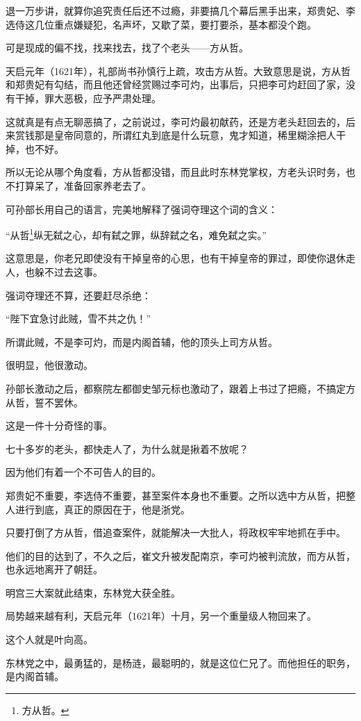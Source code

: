 \begin{multicols}{\theparacolNo}
		退一万步讲，就算你追究责任后还不过瘾，非要搞几个幕后黑手出来，郑贵妃、李选侍这几位重点嫌疑犯，名声坏，又歇了菜，要打要杀，基本都没个跑。

		可是现成的偏不找，找来找去，找了个老头——方从哲。

		天启元年（1621年），礼部尚书孙慎行上疏，攻击方从哲。大致意思是说，方从哲和郑贵妃有勾结，而且他还曾经赏赐过李可灼，出事后，只把李可灼赶回了家，没有干掉，罪大恶极，应予严肃处理。

		这就真是有点无聊恶搞了，之前说过，李可灼最初献药，还是方老头赶回去的，后来赏钱那是皇帝同意的，所谓红丸到底是什么玩意，鬼才知道，稀里糊涂把人干掉，也不好。

		所以无论从哪个角度看，方从哲都没错，而且此时东林党掌权，方老头识时务，也不打算呆了，准备回家养老去了。

		可孙部长用自己的语言，完美地解释了强词夺理这个词的含义：

		“从哲\footnote{方从哲。}纵无弑之心，却有弑之罪，纵辞弑之名，难免弑之实。”

		这意思是，你老兄即使没有干掉皇帝的心思，也有干掉皇帝的罪过，即使你退休走人，也躲不过去这事。

		强词夺理还不算，还要赶尽杀绝：

		“陛下宜急讨此贼，雪不共之仇！”

		所谓此贼，不是李可灼，而是内阁首辅，他的顶头上司方从哲。

		很明显，他很激动。

		孙部长激动之后，都察院左都御史邹元标也激动了，跟着上书过了把瘾，不搞定方从哲，誓不罢休。

		这是一件十分奇怪的事。

		七十多岁的老头，都快走人了，为什么就是揪着不放呢？

		因为他们有着一个不可告人的目的。

		郑贵妃不重要，李选侍不重要，甚至案件本身也不重要。之所以选中方从哲，把整人进行到底，真正的原因在于，他是浙党。

		只要打倒了方从哲，借追查案件，就能解决一大批人，将政权牢牢地抓在手中。

		他们的目的达到了，不久之后，崔文升被发配南京，李可灼被判流放，而方从哲，也永远地离开了朝廷。

		明宫三大案就此结束，东林党大获全胜。

		局势越来越有利，天启元年（1621年）十月，另一个重量级人物回来了。

		这个人就是叶向高。

		东林党之中，最勇猛的，是杨涟，最聪明的，就是这位仁兄了。而他担任的职务，是内阁首辅。


\end{multicols}
